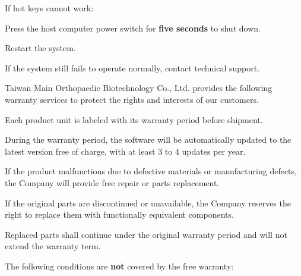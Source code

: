 \documentclass[11pt,a4paper]{article}
\begin{document}
\begin{tbkTable}[caption={Emergency Keyboard Shortcuts}]
\end{tbkTable}

If hot keys cannot work:
\begin{tbkSteps}
  \item Press the host computer power switch for \textbf{five seconds} to shut down.
  \item Restart the system.
  \item If the system still fails to operate normally, contact technical support.
\end{tbkSteps}



Taiwan Main Orthopaedic Biotechnology Co., Ltd. provides the following warranty
services to protect the rights and interests of our customers.


Each product unit is labeled with its warranty period before shipment.


\begin{tbkFeatureList}
  \item During the warranty period, the software will be automatically updated
        to the latest version free of charge, with at least 3 to 4 updates per year.
  \item If the product malfunctions due to defective materials or manufacturing
        defects, the Company will provide free repair or parts replacement.
  \item If the original parts are discontinued or unavailable, the Company reserves
        the right to replace them with functionally equivalent components.
  \item Replaced parts shall continue under the original warranty period and will
        not extend the warranty term.
\end{tbkFeatureList}


The following conditions are \textbf{not} covered by the free warranty:
\end{document}
